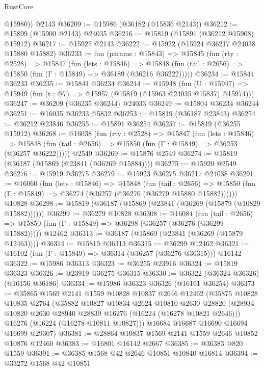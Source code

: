 \begin{lexlean}{RustCore}
\begin{coremodule}
        @15980))
    @2143
@36209 := @15986 (@36182 (@15836 @2143))
@36212 := @15899 (@15900 @2143) @24035
@36216 := @15819 (@15891 (@36212 @15908) @15912)
@36217 := @15925 @2143
@36222 := @15922 (@15924 @36217 @24038 @15880 @15882)
@36233 := fun (params : @15843) =>
  @15845
    (fun (rty : @2528) =>
    @15847
      (fun (lets : @15846) =>
      @15848 (fun (tail : @2656) => @15850 (fun (Γ : @15849) => @36189 (@36216 @36222)))))
@36234 := @15844 @36233
@36235 := @15841 @36234
@36244 := @15948
    (fun (U : @15947) => @15949 (fun (t : @7) => @15957 (@15819 (@15963 @24035 @15837) @15974)))
@36247 := @36209 (@36235 @36244) @24033
@36249 := @15804 @36234 @36244
@36251 := @16035 @36233 @5832
@36253 := @15819 (@36187 @23843)
@36254 := @36212 @23846
@36255 := @15891 @36254
@36257 := @15819 (@36255 @15912)
@36268 := @16038
    (fun (rty : @2528) =>
    @15847
      (fun (lets : @15846) =>
      @15848 (fun (tail : @2656) => @15850 (fun (Γ : @15849) => @36253 (@36257 @36222)))))
    @2549
@36269 := @15876 @2549
@36274 := @15819 (@36187 (@15869 (@23841 (@36269 @15884))))
@36275 := @15920 @2549
@36276 := @15919 @36275
@36279 := @15923 @36275 @36217 @24038
@36291 := @16060
    (fun (lets : @15846) =>
    @15848
      (fun (tail : @2656) =>
      @15850 (fun (Γ : @15849) => @36274 (@36257 (@36276 (@36279 @15880 @15882))))))
    @10828
@36298 := @15819 (@36187 (@15869 (@23841 (@36269 (@15879 (@10829 @15882))))))
@36299 := @36279 @10828
@36308 := @16084
    (fun (tail : @2656) => @15850 (fun (Γ : @15849) => @36298 (@36257 (@36276 (@36299 @15882)))))
    @12462
@36313 := @36187 (@15869 (@23841 (@36269 (@15879 @12463))))
@36314 := @15819 @36313
@36315 := @36299 @12462
@36321 := @16102 (fun (Γ : @15849) => @36314 (@36257 (@36276 @36315))) @16142
@36322 := @15986 @36313
@36323 := @36255 @23916
@36324 := @15819 @36323
@36326 := @23919 @36275 @36315
@36330 := @36322 (@36324 @36326) (@16156 @36186)
@36334 := @15986 @36323 @36326 (@16161 @36254)
@36373 := @35865
    @1569
    @2141
    @1559
    @10828
    @10837
    @2646
    @12462
    (@35875
      @10828
      @10835
      @2764
      (@35882
        @10827
        @10834
        @2624
        @10810
        @2630
        @28820
        (@28934 @10820 @2630 @28940 @28839 @16276 (@16224 (@16278 @10821 @2646)))
        @16276
        (@16224 (@16278 @10811 @10827)))
      @16684
      @16687
      @16690
      @16694
      @16699
      @29307)
@36381 := @28864 @10837 @1569 @2141 @1559 @2646 @10852 @10876 @12460
@36383 := @16801 @16142 @2667
@36385 := @36383 @820 @1559
@36391 := @36385 @1568 @42 @2646 @10851 @10840 @16814
@36394 := @33272 @1568 @42 @10851

\end{coremodule}
\end{lexlean}
